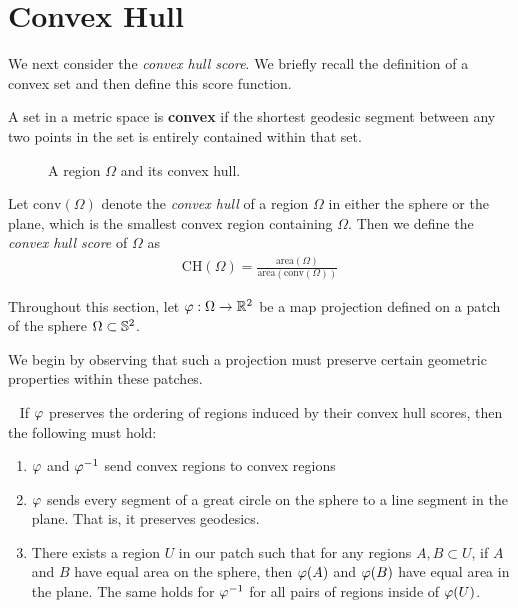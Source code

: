 \section{Convex Hull}\label{sec:ch}
We next consider the \textit{convex hull
score}.  We briefly recall the definition of a convex set and then
define this score function.


\begin{definition}
	A set in a metric space is \textbf{convex} if the shortest geodesic segment between any two points in the set is entirely 
	contained within that set.
\end{definition}



\begin{figure}[h]
	\centering
	
	\caption{A region $\Omega$ and its convex hull.}
	\label{fig:ch_example}
\end{figure}

\begin{definition}
  Let $\mathrm{conv}(\Omega)$ denote the \textit{convex hull} of
  a region $\Omega$ in either the sphere or the plane, which is the
  smallest convex region containing $\Omega$.  Then we define the
  \textit{convex hull score} of $\Omega$ as 
  \begin{align*}
    \mathrm{CH}(\Omega)=
    \frac{\mathrm{area}(\Omega)}{\mathrm{area}(\mathrm{conv}(\Omega))}
  \end{align*}
\end{definition}



Throughout this section, let $\varphi:\Omega \to \mathbb{R}^2$ be a 
map projection defined on a patch of the sphere $\Omega\subset \mathbb{S}^2$.


We begin by observing that such a projection must preserve certain geometric properties within these patches.
\begin{lemma}~\label{lem:CH_prep}
	If $\varphi$ preserves the ordering of regions induced by their convex hull scores, then the following must 
	hold:
	\begin{enumerate}
		\item $\varphi$ and $\varphi^{-1}$ send convex regions to convex regions
		\item $\varphi$ sends every segment of a great circle on the sphere to a line segment in the plane.  That is, it preserves geodesics.
		\item There exists a region $U$ in our patch
		such that for any regions $A,B\subset U$, if 
		$A$ and $B$ have equal area on the sphere, then 
		$\varphi(A)$ and $\varphi(B)$ have equal area in the plane.  The same holds 
		for $\varphi^{-1}$ for all pairs of regions inside of $\varphi(U)$.
	\end{enumerate}
\end{lemma}

